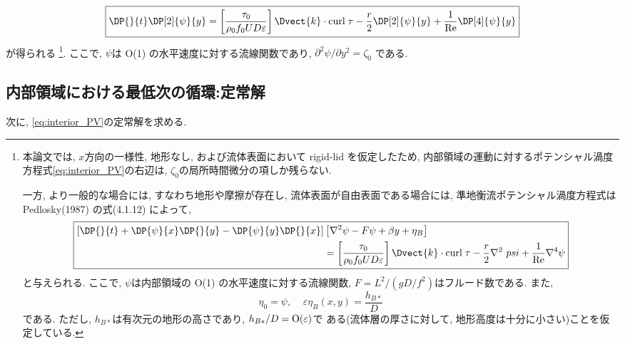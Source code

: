 \begin{equation}
 \boxed{
   \DP{}{t} \DP[2]{\psi}{y} = 
     \left[\dfrac{\tau_0}{\rho_0 f_0 U D \varepsilon}  \right] \Dvect{k} \cdot {\rm curl \;} \tau 
     - \dfrac{r}{2}\DP[2]{\psi}{y} + \dfrac{1}{\rm Re}\DP[4]{\psi}{y}
 }
\label{eq:interior_PV}
\end{equation}
が得られる%
\footnote{
本論文では, $x$方向の一様性, 地形なし, および流体表面において rigid-lid を仮定したため, 
内部領域の運動に対するポテンシャル渦度方程式\eqref{eq:interior_PV}の右辺は,
$\zeta_0$の局所時間微分の項しか残らない. 

一方, より一般的な場合には, 
すなわち地形や摩擦が存在し, 流体表面が自由表面である場合には, 
準地衡流ポテンシャル渦度方程式は Pedlosky(1987) の式(4.1.12) によって, 
\begin{equation*}
\boxed{
 \begin{split}
   \left[ \DP{}{t} + \DP{\psi}{x}\DP{}{y} - \DP{\psi}{y}\DP{}{x} \right]
     &\left[\nabla^2 \psi - F \psi + \beta y + \eta_B \right] \\
     &= \left[\dfrac{\tau_0}{\rho_0 f_0 U D \varepsilon}  \right] \Dvect{k} \cdot {\rm curl \;} \tau 
     - \dfrac{r}{2}\nabla^2\ psi + \dfrac{1}{\rm Re} \nabla^4 \psi
 \end{split}
}
\end{equation*}
と与えられる.
ここで, $\psi$は内部領域の O(1) の水平速度に対する流線関数, 
$F=L^2/(gD/f^2)$はフルード数である. 
また, 
$$
\eta_0=\psi, \;\;\;\; 
\varepsilon \eta_B(x,y)=\dfrac{h_{B*}}{D}
$$
である. ただし, $h_{B*}$は有次元の地形の高さであり, $h_{B*}/D = {\rm O}(\varepsilon)$で
ある(流体層の厚さに対して, 地形高度は十分に小さい)ことを仮定している. 
}. 
ここで, $\psi$は O(1) の水平速度に対する流線関数であり, 
$\partial^2 \psi/ \partial y^2=\zeta_0$
である. 

\subsection{内部領域における最低次の循環:定常解}
次に, \eqref{eq:interior_PV}の定常解を求める. 

